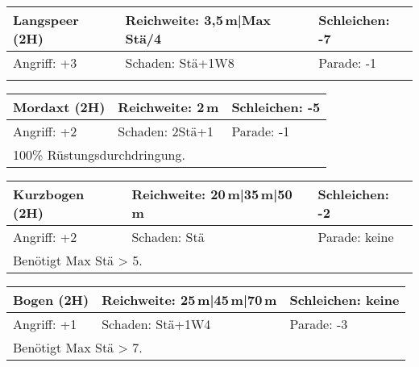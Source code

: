 \documentclass[../../Heldenanleitung2]{subfiles}
\begin{document}
\newline \newline\newline
\begin{tabular}{|p{}|p{}|p{}|}
\hline
\textbf{Langspeer (2H)} & Reichweite: 3,5\,m|Max Stä/4 & Schleichen: -7\\
\hline
Angriff: +3 & Schaden: Stä+1W8 & Parade: -1\\
\hline
\multicolumn{3}{|p{0.99\textwidth}|}{} \\
\hline
\end{tabular}
\newline \newline\newline
\begin{tabular}{|p{}|p{}|p{}|}
\hline
\textbf{Mordaxt (2H)} & Reichweite: 2\,m & Schleichen: -5\\
\hline
Angriff: +2 & Schaden: 2Stä+1 & Parade: -1\\
\hline
\multicolumn{3}{|p{0.99\textwidth}|}{100\% Rüstungsdurchdringung.} \\
\hline
\end{tabular}
\newline \newline\newline
\begin{tabular}{|p{}|p{}|p{}|}
\hline
\textbf{Kurzbogen (2H)} & Reichweite: 20\,m|35\,m|50\,m & Schleichen: -2 \\
\hline
Angriff: +2 & Schaden: Stä & Parade: keine\\
\hline
\multicolumn{3}{|p{0.99\textwidth}|}{Benötigt Max Stä > 5.} \\
\hline
\end{tabular}
\newline \newline\newline
\begin{tabular}{|p{}|p{}|p{}|}
\hline
\textbf{Bogen (2H)} & Reichweite: 25\,m|45\,m|70\,m & Schleichen: keine\\
\hline
Angriff: +1 & Schaden: Stä+1W4 & Parade: -3\\
\hline
\multicolumn{3}{|p{0.99\textwidth}|}{Benötigt Max Stä > 7.} \\
\hline
\end{tabular}
\newline \newline\newline
\end{document}
